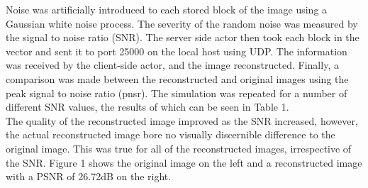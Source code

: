 \documentclass{article}
\begin{document}
Noise was artificially introduced to each stored block of the image using a Gaussian white noise process. The severity of the random noise was measured by the signal to noise ratio (SNR). The server side actor then took each block in the vector and sent it to port 25000 on the local host using UDP. The information was received by the client-side actor, and the image reconstructed. Finally, a comparison was made between the reconstructed and original images using the peak signal to noise ratio (pnsr). The simulation was repeated for a number of different SNR values, the results of which can be seen in Table 1.\\

The quality of the reconstructed image improved as the SNR increased, however, the actual reconstructed image bore no visually discernible difference to the original image. This was true for all of the reconstructed images, irrespective of the SNR. Figure 1 shows  the original image on the left and a reconstructed image with a PSNR of 26.72dB on the right.
  
\end{document}
